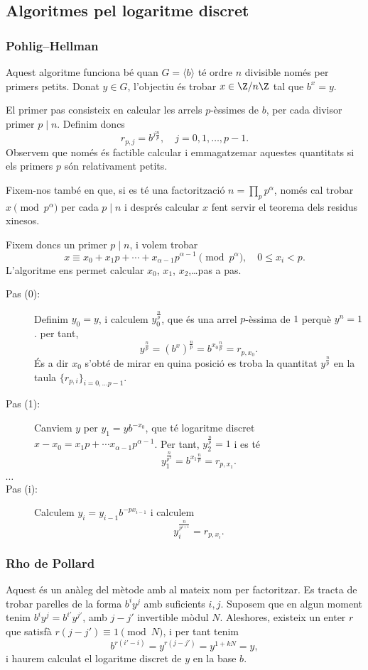  \subsection{Algoritmes pel logaritme discret}
 

  \subsubsection{Pohlig--Hellman}
  Aquest algoritme funciona bé quan $G=\langle b\rangle$ té ordre $n$ divisible només per primers petits. Donat $y\in G$, l'objectiu és trobar $x\in\Z/n\Z$ tal que $b^x=y$.
  
  El primer pas consisteix en calcular les arrels $p$-èssimes de $b$, per cada divisor primer $p\mid n$. Definim doncs
  \[
  r_{p,j} = b^{j\frac{n}{p}},\quad j=0,1,\ldots,p-1.
  \]
  Observem que només és factible calcular i emmagatzemar aquestes quantitats si els primers $p$ són relativament petits.
  
  Fixem-nos també en que, si es té una factorització $n=\prod_{p} p^\alpha$, només cal trobar $x\pmod{p^\alpha}$ per cada $p\mid n$ i després calcular $x$ fent servir el teorema dels residus xinesos.
  
  Fixem doncs un primer $p\mid n$, i volem trobar
  \[
  x\equiv x_0+x_1p+\cdots+x_{\alpha-1}p^{\alpha-1}\pmod{p^\alpha},\quad 0\leq x_i<p.
  \]
  L'algoritme ens permet calcular $x_0$, $x_1$, $x_2$,\ldots pas a pas.
  
  \begin{description}
      \item[Pas (0):] Definim $y_0=y$, i calculem $y_0^{\frac{n}{p}}$, que és una arrel $p$-èssima de $1$ perquè $y^n=1$. per tant,
      \[
      y^{\frac{n}{p}} = (b^x)^{\frac{n}{p}} = b^{x_0\frac{n}{p}} = r_{p,x_0}.
      \]
      És a dir $x_0$ s'obté de mirar en quina posició es troba la quantitat $y^{\frac{n}{p}}$ en la taula $\{r_{p,i}\}_{i=0,\ldots p-1}$.
      \item[Pas (1):] Canviem $y$ per $y_1=yb^{-x_0}$, que té logaritme discret $x-x_0=x_1p+\cdots x_{\alpha-1}p^{\alpha-1}$. Per tant, $y_2^{\frac{n}{p}}=1$ i es té 
      \[
      y_1^{\frac{n}{p^2}}=b^{x_1\frac{n}{p}} = r_{p,x_1}.
      \]
      \item[$\cdots$]
      \item[Pas (i):] Calculem $y_i=y_{i-1}b^{-px_{i-1}}$ i calculem
      \[
      y_i^{\frac{n}{p^{i+1}}} = r_{p,x_i}.
      \]
  \end{description}
  
  
  \subsubsection{Rho de Pollard}
  Aquest és un anàleg del mètode amb al mateix nom per factoritzar. Es tracta de trobar parelles de la forma $b^iy^j$ amb suficients $i,j$. Suposem que en algun moment tenim $b^iy^j=b^{i'}y^{j'}$, amb $j- j'$ invertible mòdul $N$. Aleshores, existeix un enter $r$ que satisfà $r(j-j')\equiv 1\pmod N$, i per tant tenim
  \[
  b^{r(i'-i)} = y^{r(j-j')} = y^{1+kN}=y,
  \]
  i haurem calculat el logaritme discret de $y$ en la base $b$.
  
